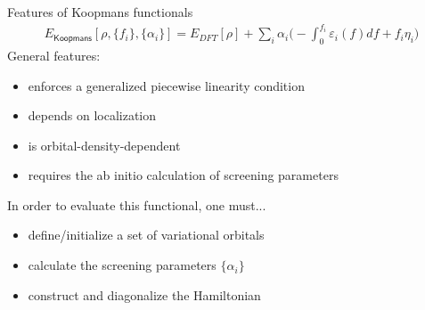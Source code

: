 \documentclass[xcolor=table,aspectratio=169]{beamer}
\numberwithin{equation}{section}
\begin{document}
\begin{frame}{Features of Koopmans functionals}
   \begin{align*}
      E_\mathsf{Koopmans}[\rho,{\{f_i\}}, {\{\alpha_i\}}]
      = {E_{DFT}[\rho]}
      + \sum_i
      {\alpha_i}
      \Biggl(
      -
         {\int^{f_i}_{0} \varepsilon_i(f) df}
      +
         {f_i {\eta_i}}
      \Biggr)
   \end{align*}
   General features:
   \begin{itemize}
      \item enforces a generalized piecewise linearity condition
      \item depends on localization
      \item is orbital-density-dependent
      \item requires the ab initio calculation of screening parameters
   \end{itemize}
   
   In order to evaluate this functional, one must...
   \begin{itemize}
      \item define/initialize a set of variational orbitals
      \item calculate the screening parameters $\{\alpha_i\}$
      \item construct and diagonalize the Hamiltonian
   \end{itemize}
\end{frame}
\end{document}
